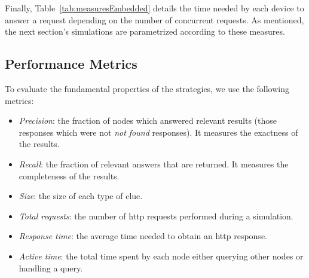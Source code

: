 Finally, Table~\ref{tab:measuresEmbedded} details the time needed by each device to answer a request depending on the number of concurrent requests.
As mentioned, the next section's simulations are parametrized according to these measures.






\subsection{Performance Metrics}
To evaluate the fundamental properties of the strategies, we use the following metrics:
\begin{itemize}
  \item \textit{Precision}: the fraction of nodes which answered relevant results (those responses which were not \textit{not found} responses).
                            It measures the exactness of the results.
  \item \textit{Recall}: the fraction of relevant answers that are returned.
                         It measures the completeness of the results.%
  \item \textit{Size}: the size of each type of clue.
  \item \textit{Total requests}: the number of \acs{http} requests performed during a simulation.
  \item \textit{Response time}: the average time needed to obtain an \acs{http} response.
  \item \textit{Active time}: the total time spent by each node either querying other nodes or handling a query.
\end{itemize}